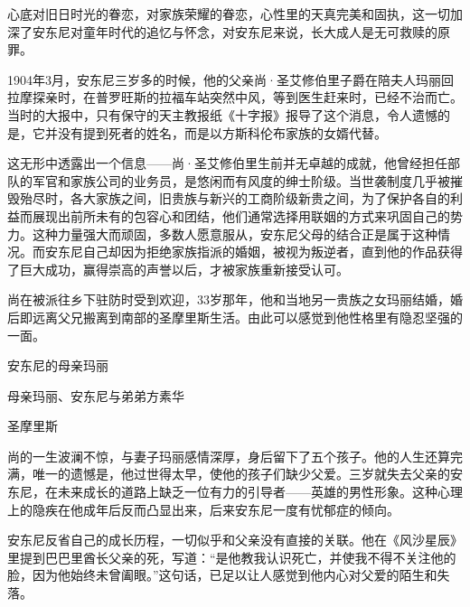 心底对旧日时光的眷恋，对家族荣耀的眷恋，心性里的天真完美和固执，这一切加深了安东尼对童年时代的追忆与怀念，对安东尼来说，长大成人是无可救赎的原罪。


\stoptitle

\starttitle[title={3}]

1904年3月，安东尼三岁多的时候，他的父亲尚·圣艾修伯里子爵在陪夫人玛丽回拉摩探亲时，在普罗旺斯的拉福车站突然中风，等到医生赶来时，已经不治而亡。当时的大报中，只有保守的天主教报纸《十字报》报导了这个消息，令人遗憾的是，它并没有提到死者的姓名，而是以方斯科伦布家族的女婿代替。

这无形中透露出一个信息------尚·圣艾修伯里生前并无卓越的成就，他曾经担任部队的军官和家族公司的业务员，是悠闲而有风度的绅士阶级。当世袭制度几乎被摧毁殆尽时，各大家族之间，旧贵族与新兴的工商阶级新贵之间，为了保护各自的利益而展现出前所未有的包容心和团结，他们通常选择用联姻的方式来巩固自己的势力。这种力量强大而顽固，多数人愿意服从，安东尼父母的结合正是属于这种情况。而安东尼自己却因为拒绝家族指派的婚姻，被视为叛逆者，直到他的作品获得了巨大成功，赢得崇高的声誉以后，才被家族重新接受认可。

尚在被派往乡下驻防时受到欢迎，33岁那年，他和当地另一贵族之女玛丽结婚，婚后即远离父兄搬离到南部的圣摩里斯生活。由此可以感觉到他性格里有隐忍坚强的一面。

{\startalignment[center]
 \stopalignment}
安东尼的母亲玛丽

{\startalignment[center]
 \stopalignment}
母亲玛丽、安东尼与弟弟方素华

{\startalignment[center]
 \stopalignment}
圣摩里斯

尚的一生波澜不惊，与妻子玛丽感情深厚，身后留下了五个孩子。他的人生还算完满，唯一的遗憾是，他过世得太早，使他的孩子们缺少父爱。三岁就失去父亲的安东尼，在未来成长的道路上缺乏一位有力的引导者------英雄的男性形象。这种心理上的隐疾在他成年后反而凸显出来，后来安东尼一度有忧郁症的倾向。

安东尼反省自己的成长历程，一切似乎和父亲没有直接的关联。他在《风沙星辰》里提到巴巴里酋长父亲的死，写道：“是他教我认识死亡，并使我不得不关注他的脸，因为他始终未曾阖眼。”这句话，已足以让人感觉到他内心对父爱的陌生和失落。

